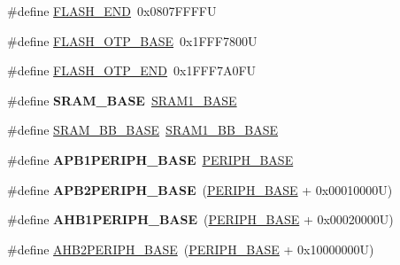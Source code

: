 \begin{DoxyCompactItemize}
\item 
\#define \mbox{\hyperlink{group___peripheral__memory__map_ga8be554f354e5aa65370f6db63d4f3ee4}{F\+L\+A\+S\+H\+\_\+\+E\+ND}}~0x0807\+F\+F\+F\+FU
\item 
\#define \mbox{\hyperlink{group___peripheral__memory__map_ga91d296a67aec0da8f31c368cbc0eea94}{F\+L\+A\+S\+H\+\_\+\+O\+T\+P\+\_\+\+B\+A\+SE}}~0x1\+F\+F\+F7800U
\item 
\#define \mbox{\hyperlink{group___peripheral__memory__map_ga5bec9c5a91e312fca36f256f508ceee1}{F\+L\+A\+S\+H\+\_\+\+O\+T\+P\+\_\+\+E\+ND}}~0x1\+F\+F\+F7\+A0\+FU
\item 
\mbox{\label{group___peripheral__memory__map_ga05e8f3d2e5868754a7cd88614955aecc}} 
\#define {\bfseries S\+R\+A\+M\+\_\+\+B\+A\+SE}~\mbox{\hyperlink{group___peripheral__memory__map_ga7d0fbfb8894012dbbb96754b95e562cd}{S\+R\+A\+M1\+\_\+\+B\+A\+SE}}
\item 
\#define \mbox{\hyperlink{group___peripheral__memory__map_gad3548b6e2f017f39d399358f3ac98454}{S\+R\+A\+M\+\_\+\+B\+B\+\_\+\+B\+A\+SE}}~\mbox{\hyperlink{group___peripheral__memory__map_gac4c4f61082e4b168f29d9cf97dc3ca5c}{S\+R\+A\+M1\+\_\+\+B\+B\+\_\+\+B\+A\+SE}}
\item 
\mbox{\label{group___peripheral__memory__map_ga45666d911f39addd4c8c0a0ac3388cfb}} 
\#define {\bfseries A\+P\+B1\+P\+E\+R\+I\+P\+H\+\_\+\+B\+A\+SE}~\mbox{\hyperlink{group___peripheral__memory__map_ga9171f49478fa86d932f89e78e73b88b0}{P\+E\+R\+I\+P\+H\+\_\+\+B\+A\+SE}}
\item 
\mbox{\label{group___peripheral__memory__map_ga25b99d6065f1c8f751e78f43ade652cb}} 
\#define {\bfseries A\+P\+B2\+P\+E\+R\+I\+P\+H\+\_\+\+B\+A\+SE}~(\mbox{\hyperlink{group___peripheral__memory__map_ga9171f49478fa86d932f89e78e73b88b0}{P\+E\+R\+I\+P\+H\+\_\+\+B\+A\+SE}} + 0x00010000\+U)
\item 
\mbox{\label{group___peripheral__memory__map_ga811a9a4ca17f0a50354a9169541d56c4}} 
\#define {\bfseries A\+H\+B1\+P\+E\+R\+I\+P\+H\+\_\+\+B\+A\+SE}~(\mbox{\hyperlink{group___peripheral__memory__map_ga9171f49478fa86d932f89e78e73b88b0}{P\+E\+R\+I\+P\+H\+\_\+\+B\+A\+SE}} + 0x00020000\+U)
\item 
\#define \mbox{\hyperlink{group___peripheral__memory__map_gaeedaa71d22a1948492365e2cd26cfd46}{A\+H\+B2\+P\+E\+R\+I\+P\+H\+\_\+\+B\+A\+SE}}~(\mbox{\hyperlink{group___peripheral__memory__map_ga9171f49478fa86d932f89e78e73b88b0}{P\+E\+R\+I\+P\+H\+\_\+\+B\+A\+SE}} + 0x10000000\+U)

\end{DoxyCompactItemize}
